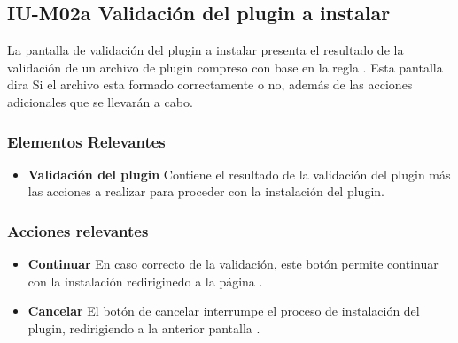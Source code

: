 
\subsection{IU-M02a Validación del plugin a instalar}

 La pantalla de validación del plugin a instalar presenta el resultado de la validación de un
 archivo de plugin compreso con base en la regla . Esta pantalla dira Si el archivo
 esta formado correctamente o no, además de las acciones adicionales que se llevarán a cabo.


\subsubsection{Elementos Relevantes}

    \begin{itemize}
    \item {\bf Validación del plugin}
        Contiene el resultado de la validación del plugin más las acciones
        a realizar para proceder con la instalación del plugin.
        
    \end{itemize}

\subsubsection{Acciones relevantes}

    \begin{itemize}
    \item {\bf Continuar}
        En caso correcto de la validación, este botón permite continuar con la instalación
        rediriginedo a la página .

    \item {\bf Cancelar}
        El botón de cancelar interrumpe el proceso de instalación del plugin, redirigiendo
        a la anterior pantalla .
    \end{itemize}

\clearpage
